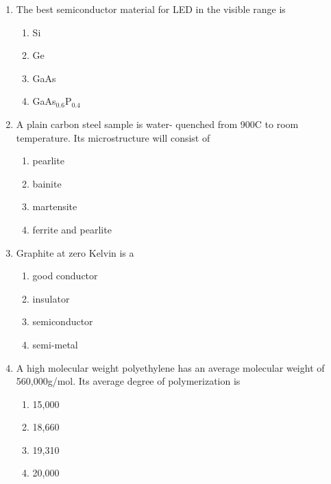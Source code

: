 \documentclass[a4paper,10pt]{article}
\begin{document}
\begin{enumerate}
\item The best semiconductor material for LED in the visible range is
\hfill{}

\begin{multicols}{4}
\begin{enumerate}
\item Si
\item Ge
\item GaAs
\item GaAs$_{0.6}$P$_{0.4}$
\end{enumerate}
\end{multicols}

\item A plain carbon steel sample is water- quenched from 900\degree C to room temperature. Its microstructure will consist of
\hfill{}

\begin{multicols}{2}
\begin{enumerate}
\item pearlite
\item bainite
\item martensite
\item ferrite and pearlite
\end{enumerate}
\end{multicols}

\item Graphite at zero Kelvin is a
\hfill{}

\begin{multicols}{4}
\begin{enumerate}
\item good conductor
\item insulator
\item semiconductor
\item semi-metal
\end{enumerate}
\end{multicols}

\item A high molecular weight polyethylene has an average molecular weight of 560,000g/mol. Its average degree of polymerization is
\hfill{}

\begin{multicols}{4}
\begin{enumerate}
\item 15,000
\item 18,660
\item 19,310
\item 20,000
\end{enumerate}
\end{multicols}


\end{enumerate}
\end{document}
